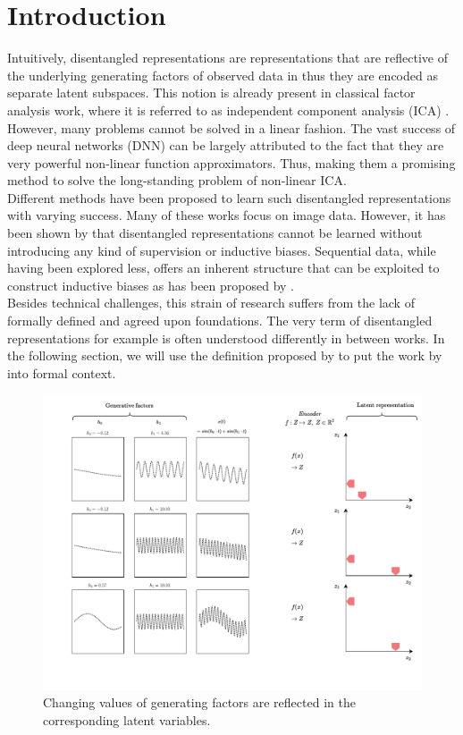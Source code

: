 \documentclass{article} %
\begin{document}
\section*{Introduction}
Intuitively, disentangled representations are representations that are reflective of the underlying generating factors of observed data in thus they are encoded as separate latent subspaces. This notion is already present in classical factor analysis work, where it is referred to as independent component analysis (ICA) \cite{comon1992independent}.\\
However, many problems cannot be solved in a linear fashion. The vast success of deep neural networks (DNN) can be largely attributed to the fact that they are very powerful non-linear function approximators. Thus, making them a promising method to solve the long-standing problem of non-linear ICA.\\
Different methods have been proposed to learn such disentangled representations \cite{higgins2016beta, chen2016infogan, kulkarni2015deep} with varying success. Many of these works focus on image data. However, it has been shown by \citet{locatello2019challenging} that disentangled representations cannot be learned without introducing any kind of supervision or inductive biases. Sequential data, while having been explored less, offers an inherent structure that can be exploited to construct inductive biases as has been proposed by \citet{hsu2017unsupervised}.\\
Besides technical challenges, this strain of research suffers from the lack of formally defined and agreed upon foundations. The very term of disentangled representations for example is often understood differently in between works. In the following section, we will use the definition proposed by \citet{higgins2018towards} to put the work by \citet{hsu2017unsupervised} into formal context.

\begin{figure}
	\centering
	\includegraphics[width=.8\linewidth]{../figures/intution_3x3_static.pdf}
	\caption{Changing values of generating factors are reflected in the corresponding latent variables.}
\end{figure}
\end{document}
